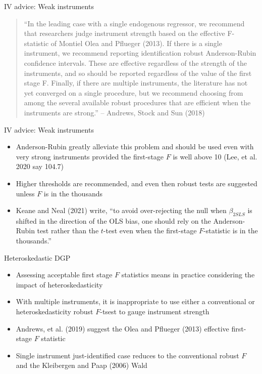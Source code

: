 \documentclass{beamer}
\begin{document}
\begin{frame}{IV advice: Weak instruments}

\begin{quote}
``In the leading case with a single endogenous regressor, we recommend that researchers judge instrument strength based on the effective F-statistic of Montiel Olea and Pflueger (2013).  If there is a single instrument, we recommend reporting identification robust Anderson-Rubin confidence intervals. These are effective regardless of the strength of the instruments, and so should be reported regardless of the value of the first stage F.  Finally, if there are multiple instruments, the literature has not yet converged on a single procedure, but we recommend choosing from among the several available robust procedures that are efficient when the instruments are strong.'' -- Andrews, Stock and Sun (2018)
\end{quote}

\end{frame}


\begin{frame}{IV advice: Weak instruments}

\begin{itemize}
	\item Anderson-Rubin greatly alleviate this problem and should be used even with very strong instruments provided the first-stage $F$ is well above 10 (Lee, et al. 2020 say 104.7)
	\item Higher thresholds are recommended, and even then robust tests are suggested unless $F$ is in the thousands
	\item Keane and Neal (2021) write, ``to avoid over-rejecting the null when $\beta_{2SLS}$ is shifted in the direction of the OLS bias, one should rely on the Anderson-Rubin test rather than the $t$-test even when the first-stage $F$-statistic is in the thousands.'' 
\end{itemize}

\end{frame}

\begin{frame}{Heteroskedastic DGP}

\begin{itemize}
\item Assessing acceptable first stage $F$ statistics means in practice considering the impact of heteroskedasticity
\item With multiple instruments, it is inappropriate to use either a conventional or heteroskedasticity robust $F$-tsest to gauge instrument strength
\item Andrews, et al. (2019) suggest the Olea and Pflueger (2013) effective first-stage $F$ statistic
\item Single instrument just-identified case reduces to the conventional robust $F$ and the Kleibergen and Paap (2006) Wald
\end{itemize}

\end{frame}
\end{document}
